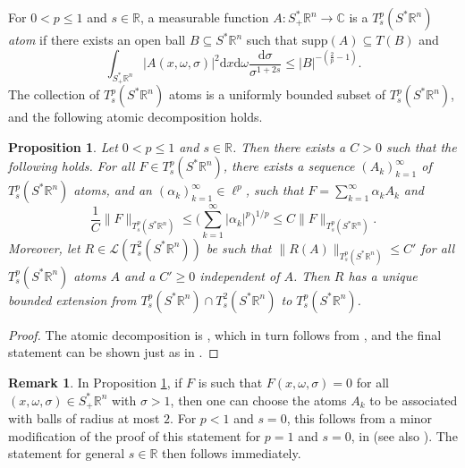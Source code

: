 \documentclass{amsart}
\newcommand {\C}{{\mathbb C}}
\newcommand {\ud}{\mathrm{d}}
\newcommand {\La}{\mathcal{L}}
\newcommand {\R}{\mathbb R}
\newcommand {\Rn}{\mathbb{R}^{n}}
\newcommand {\supp}{\mathrm{supp}}
\newcommand {\Sp}{S^{*}\Rn}
\newcommand {\Spp}{S^{*}_{+}\Rn}
\newcommand {\w}{\omega}
\newtheorem{proposition}[theorem]{Proposition}
\theoremstyle{definition}
\newtheorem{remark}[theorem]{Remark}
\numberwithin{equation}{section}
\begin{document}
For $0<p\leq 1$ and $s\in\R$, a measurable function $A:\Spp\to\C$ is a \emph{$T^{p}_{s}(\Sp)$ atom} if there exists an open ball $B\subseteq\Sp$ such that $\supp(A)\subseteq T(B)$ and 
\[
\int_{\Spp}|A(x,\w,\sigma)|^{2}\ud x\ud\w\frac{\ud\sigma}{\sigma^{1+2s}}\leq |B|^{-(\frac{2}{p}-1)}.
\]
The collection of $T^{p}_{s}(\Sp)$ atoms is a uniformly bounded subset of $T^{p}_{s}(\Sp)$, and the following atomic decomposition holds.


\begin{proposition}\label{prop:atomictent}
Let $0<p\leq 1$ and $s\in\R$. Then there exists a $C>0$ such that the following holds. For all $F\in T^{p}_{s}(\Sp)$, there exists a sequence $(A_{k})_{k=1}^{\infty}$ of $T^{p}_{s}(\Sp)$ atoms, and an $(\alpha_{k})_{k=1}^{\infty}\in\ell^{p}$, such that $F=\sum_{k=1}^{\infty}\alpha_{k}A_{k}$ and
\[
\frac{1}{C}\|F\|_{T^{p}_{s}(\Sp)}\leq\Big(\sum_{k=1}^{\infty}|\alpha_{k}|^{p}\Big)^{1/p}\leq C\|F\|_{T^{p}_{s}(\Sp)}.
\]
Moreover, let $R\in\La(T^{2}_{s}(\Sp))$ be such that $\|R(A)\|_{T^{p}_{s}(\Sp)}\leq C'$ for all $T^{p}_{s}(\Sp)$ atoms $A$ and a $C'\geq0$ independent of $A$. Then $R$ has a unique bounded extension from $T^{p}_{s}(\Sp)\cap T^{2}_{s}(\Sp)$ to $T^{p}_{s}(\Sp)$.
\end{proposition}
\begin{proof}
The atomic decomposition is \cite[Proposition 1.10]{Amenta18}, which in turn follows from \cite{Russ07}, and the final statement can be shown just as in \cite[Lemma 2.8]{HaPoRo20}.
\end{proof}

\begin{remark}\label{rem:balls}
In Proposition \ref{prop:atomictent}, if $F$ is such that $F(x,\w,\sigma)=0$ for all $(x,\w,\sigma)\in\Spp$ with $\sigma>1$, then one can choose the atoms $A_{k}$ to be associated with balls of radius at most $2$. For $p<1$ and $s=0$, this follows from a minor modification of the proof of this statement for $p=1$ and $s=0$, in \cite[Theorem 3.6]{CaMcMo13} (see also \cite{Russ07}). The statement for general $s\in\R$ then follows immediately.
\end{remark}
\end{document}
